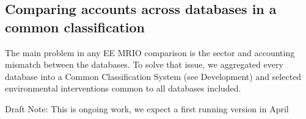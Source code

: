 \subsection{Comparing accounts across databases in a common classification}

The main problem in any EE MRIO comparison is the sector and accounting
mismatch between the databases. To solve that issue, we aggregated every
database into a Common Classification System (see Development) and
selected environmental interventions common to all databases included.

Draft Note: This is ongoing work, we expect a first running version in April
